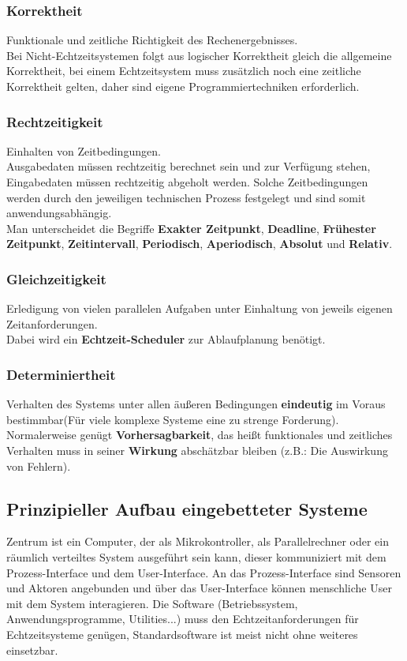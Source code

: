 \documentclass[a4paper, 10 pt, conference]{ieeeconf}
\begin{document}
\subsubsection*{\textbf{Korrektheit}}
Funktionale und zeitliche Richtigkeit des Rechenergebnisses. \\
Bei Nicht-Echtzeitsystemen folgt aus logischer Korrektheit gleich die allgemeine Korrektheit, bei einem Echtzeitsystem muss zusätzlich noch eine zeitliche Korrektheit gelten, daher sind eigene Programmiertechniken erforderlich.
\subsubsection*{\textbf{Rechtzeitigkeit}}
Einhalten von Zeitbedingungen. \\
Ausgabedaten müssen rechtzeitig berechnet sein und zur Verfügung stehen, Eingabedaten müssen rechtzeitig abgeholt werden. Solche Zeitbedingungen werden durch den jeweiligen technischen Prozess festgelegt und sind somit anwendungsabhängig. \\
Man unterscheidet die Begriffe \textbf{Exakter Zeitpunkt}, \textbf{Deadline}, \textbf{Frühester Zeitpunkt}, \textbf{Zeitintervall}, \textbf{Periodisch}, \textbf{Aperiodisch}, \textbf{Absolut} und \textbf{Relativ}. 
\subsubsection*{\textbf{Gleichzeitigkeit}}
Erledigung von vielen parallelen Aufgaben unter Einhaltung von jeweils eigenen Zeitanforderungen. \\
Dabei wird ein \textbf{Echtzeit-Scheduler} zur Ablaufplanung benötigt. 
\subsubsection*{\textbf{Determiniertheit}}
Verhalten des Systems unter allen äußeren Bedingungen  \textbf{eindeutig} im Voraus bestimmbar(Für viele komplexe Systeme  eine zu strenge Forderung). Normalerweise genügt \textbf{Vorhersagbarkeit}, das heißt funktionales und zeitliches Verhalten muss in seiner \textbf{Wirkung} abschätzbar bleiben (z.B.: Die Auswirkung von Fehlern). 


\subsection*{\textbf{Prinzipieller Aufbau eingebetteter Systeme}}
Zentrum ist ein Computer, der als Mikrokontroller, als Parallelrechner oder ein räumlich verteiltes System ausgeführt sein kann, dieser kommuniziert mit dem Prozess-Interface und dem User-Interface. An das Prozess-Interface sind Sensoren und Aktoren angebunden und über das User-Interface können menschliche User mit dem System interagieren. Die Software (Betriebssystem, Anwendungsprogramme, Utilities...) muss den Echtzeitanforderungen für Echtzeitsysteme genügen, Standardsoftware ist meist nicht ohne weiteres einsetzbar. 
\end{document}
